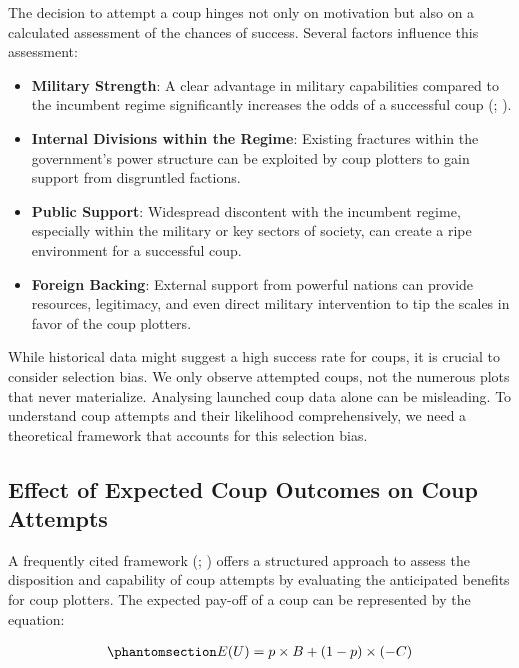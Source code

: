 \documentclass[
  12pt,
]{report}
\begin{document}
The decision to attempt a coup hinges not only on motivation but also on
a calculated assessment of the chances of success. Several factors
influence this assessment:

\begin{itemize}
\item
  \textbf{Military Strength}: A clear advantage in military capabilities
  compared to the incumbent regime significantly increases the odds of a
  successful coup (;
  ).
\item
  \textbf{Internal Divisions within the Regime}: Existing fractures
  within the government's power structure can be exploited by coup
  plotters to gain support from disgruntled factions.
\item
  \textbf{Public Support}: Widespread discontent with the incumbent
  regime, especially within the military or key sectors of society, can
  create a ripe environment for a successful coup.
\item
  \textbf{Foreign Backing}: External support from powerful nations can
  provide resources, legitimacy, and even direct military intervention
  to tip the scales in favor of the coup plotters.
\end{itemize}

While historical data might suggest a high success rate for coups, it is
crucial to consider selection bias. We only observe attempted coups, not
the numerous plots that never materialize. Analysing launched coup data
alone can be misleading. To understand coup attempts and their
likelihood comprehensively, we need a theoretical framework that
accounts for this selection bias.

\subsection{\texorpdfstring{\textbf{Effect of Expected Coup Outcomes on
Coup
Attempts}}{Effect of Expected Coup Outcomes on Coup Attempts}}\label{effect-of-expected-coup-outcomes-on-coup-attempts}

A frequently cited framework (; )
offers a structured approach to assess the disposition and capability of
coup attempts by evaluating the anticipated benefits for coup plotters.
The expected pay-off of a coup can be represented by the equation:

\begin{equation}\phantomsection\label{eq-eq1}{
\begin{aligned}
E(U) = p \times B + (1 - p) \times (-C)
\end{aligned}
}\end{equation}
\end{document}
